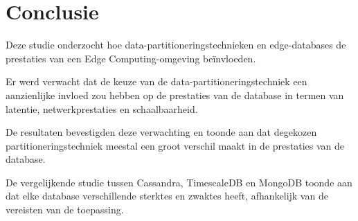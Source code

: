 
\chapter{Conclusie}%
\label{ch:conclusie}

Deze studie onderzocht hoe data-partitioneringstechnieken en edge-databases de prestaties van een Edge Computing-omgeving beïnvloeden.

Er werd verwacht dat de keuze van de data-partitioneringstechniek een aanzienlijke invloed zou hebben op de prestaties van de database in termen van latentie, netwerkprestaties en schaalbaarheid. 

De resultaten bevestigden deze verwachting en toonde aan dat degekozen partitioneringstechniek meestal een groot verschil maakt in de prestaties van de database.

De vergelijkende studie tussen Cassandra, TimescaleDB en MongoDB toonde aan dat elke database verschillende sterktes en zwaktes heeft, afhankelijk van de vereisten van de toepassing.

